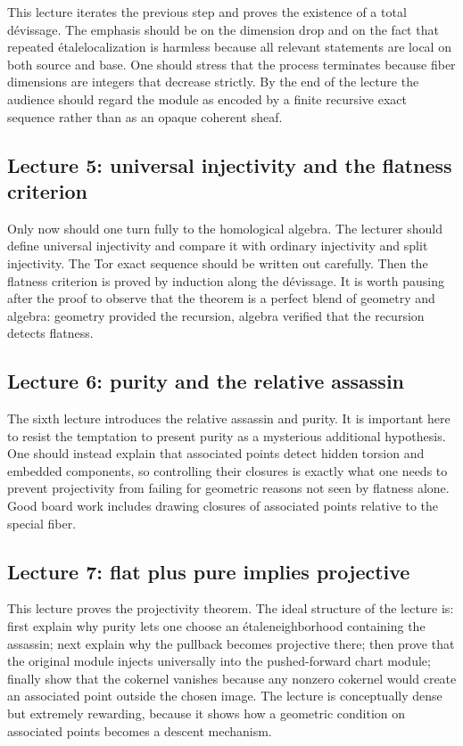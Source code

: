 \documentclass[11pt,oneside]{article}
\newcommand{\etale}{\'etale}
\begin{document}
This lecture iterates the previous step and proves the existence of a total d\'evissage.  The emphasis should be on the dimension drop and on the fact that repeated \etale localization is harmless because all relevant statements are local on both source and base.  One should stress that the process terminates because fiber dimensions are integers that decrease strictly.  By the end of the lecture the audience should regard the module as encoded by a finite recursive exact sequence rather than as an opaque coherent sheaf.

\subsection*{Lecture 5: universal injectivity and the flatness criterion}

Only now should one turn fully to the homological algebra.  The lecturer should define universal injectivity and compare it with ordinary injectivity and split injectivity.  The Tor exact sequence should be written out carefully.  Then the flatness criterion is proved by induction along the d\'evissage.  It is worth pausing after the proof to observe that the theorem is a perfect blend of geometry and algebra: geometry provided the recursion, algebra verified that the recursion detects flatness.

\subsection*{Lecture 6: purity and the relative assassin}

The sixth lecture introduces the relative assassin and purity.  It is important here to resist the temptation to present purity as a mysterious additional hypothesis.  One should instead explain that associated points detect hidden torsion and embedded components, so controlling their closures is exactly what one needs to prevent projectivity from failing for geometric reasons not seen by flatness alone.  Good board work includes drawing closures of associated points relative to the special fiber.

\subsection*{Lecture 7: flat plus pure implies projective}

This lecture proves the projectivity theorem.  The ideal structure of the lecture is: first explain why purity lets one choose an \etale neighborhood containing the assassin; next explain why the pullback becomes projective there; then prove that the original module injects universally into the pushed-forward chart module; finally show that the cokernel vanishes because any nonzero cokernel would create an associated point outside the chosen image.  The lecture is conceptually dense but extremely rewarding, because it shows how a geometric condition on associated points becomes a descent mechanism.
\end{document}
